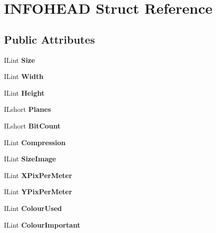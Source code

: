\hypertarget{structINFOHEAD}{}\section{I\+N\+F\+O\+H\+E\+AD Struct Reference}
\label{structINFOHEAD}
\subsection*{Public Attributes}
\begin{DoxyCompactItemize}
\item 
\mbox{\label{structINFOHEAD_adc3f540feea9864fea3c7f8191a89a4d}} 
I\+Lint {\bfseries Size}
\item 
\mbox{\label{structINFOHEAD_a0d482fee232db219181d8f25dff086b0}} 
I\+Lint {\bfseries Width}
\item 
\mbox{\label{structINFOHEAD_a184c597278db7cf5929997e9466697cc}} 
I\+Lint {\bfseries Height}
\item 
\mbox{\label{structINFOHEAD_a9589d3e27db1178df7f0fb4b7b184f2e}} 
I\+Lshort {\bfseries Planes}
\item 
\mbox{\label{structINFOHEAD_aedc887ac8b2801f8ff27a94da1142656}} 
I\+Lshort {\bfseries Bit\+Count}
\item 
\mbox{\label{structINFOHEAD_aae2b452d670d2c1abb0250d6f23e1a1a}} 
I\+Lint {\bfseries Compression}
\item 
\mbox{\label{structINFOHEAD_a62dcad8f27831095f9d4f9bdf1e2cf1d}} 
I\+Lint {\bfseries Size\+Image}
\item 
\mbox{\label{structINFOHEAD_a00e49cc1b140d47713ec036381348306}} 
I\+Lint {\bfseries X\+Pix\+Per\+Meter}
\item 
\mbox{\label{structINFOHEAD_a3fb20d019986d3df213def8d6575ff3c}} 
I\+Lint {\bfseries Y\+Pix\+Per\+Meter}
\item 
\mbox{\label{structINFOHEAD_a7960c11e635c435487520f220f837bf6}} 
I\+Lint {\bfseries Colour\+Used}
\item 
\mbox{\label{structINFOHEAD_ad831abe6b03a339eb720b7ab560b0f9b}} 
I\+Lint {\bfseries Colour\+Important}
\end{DoxyCompactItemize}


